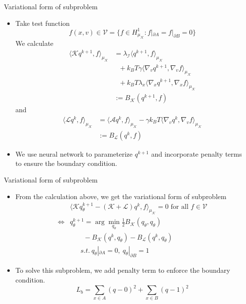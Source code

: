 \documentclass{beamer}
\newcommand{\p}{{\partial}}
\newcommand{\kbt}{k_B T}
\newcommand{\LLL}{\mathcal{L}}
\newcommand{\AAA}{\mathcal{A}}
\newcommand{\KKK}{\mathcal{K}}
\begin{document}
\begin{frame}{Variational form of subproblem}
    \begin{itemize}
        \item Take test function $$f(x,v) \in \mathcal{V} = \{f\in H^1_{\mu_\KKK}: f|_{\p A} = f|_{\p B}=0\}$$
        We calculate 
        $$
        \begin{aligned}
            \langle \KKK q^{k+1},f \rangle_{\mu_\KKK}
            &=\lambda_{\mathcal{I}}\langle  q^{k+1},f \rangle_{\mu_\KKK}  \\
            &\ \ \  +\kbt\gamma\langle  \nabla_vq^{k+1},\nabla_vf \rangle_{\mu_\KKK}\\
            &\ \ \ +\kbt\lambda_{x}\langle  \nabla_xq^{k+1},\nabla_xf \rangle_{\mu_\KKK}\\
            &:= B_\KKK(q^{k+1},f)
        \end{aligned}$$
        and 
        $$
        \begin{aligned}
            \langle \LLL q^{k},f \rangle_{\mu_\KKK}
            &=\langle  \AAA q^{k},f \rangle_{\mu_\KKK}             -\gamma\kbt\langle  \nabla_v q^{k},\nabla_v f \rangle_{\mu_\KKK}\\
            &:= B_\LLL(q^k,f)
        \end{aligned}
        $$
        \item We use neural network to parameterize $q^{k+1}$ and incorporate penalty terms to ensure the boundary condition. 
    \end{itemize}
\end{frame}

\begin{frame}{Variational form of subproblem}
    \begin{itemize}
        \item From the calculation above, we get the variational form of subproblem
        $$\begin{aligned}
            &\langle \KKK q^{k+1}_\theta - (\KKK+\LLL)q^{k},f \rangle_{\mu_\KKK} =0\text{  for all } f\in \mathcal{V}\\
            \Leftrightarrow& q^{k+1}_\theta = \arg\min_{q_\theta} \frac{1}{2}B_{\KKK}(q_\theta,q_\theta) \\
            &\ \ \ \ \ \ \ \ \ -B_\KKK(q^{k},q_\theta)-B_{\LLL}(q^{k},q_\theta) \\
            &\ \ \ \ \ \ \ s.t. \ q_\theta|_{\p A} =0,\ q_\theta|_{\p B} = 1
        \end{aligned}$$
        \item To solve this subproblem, we add penalty term to enforce the boundary condition.
            $$L_b = \sum_{x \in A}(q-0)^2 +\sum_{x \in B}(q-1)^2$$
    \end{itemize}
\end{frame}
\end{document}
